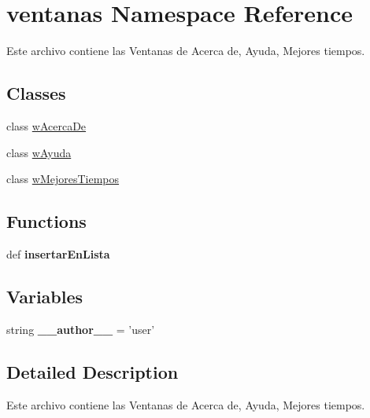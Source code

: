 \hypertarget{namespaceventanas}{\section{ventanas Namespace Reference}
\label{namespaceventanas}
}


Este archivo contiene las Ventanas de Acerca de, Ayuda, Mejores tiempos.  


\subsection*{Classes}
\begin{DoxyCompactItemize}
\item 
class \hyperlink{classventanas_1_1w_acerca_de}{w\-Acerca\-De}
\item 
class \hyperlink{classventanas_1_1w_ayuda}{w\-Ayuda}
\item 
class \hyperlink{classventanas_1_1w_mejores_tiempos}{w\-Mejores\-Tiempos}
\end{DoxyCompactItemize}
\subsection*{Functions}
\begin{DoxyCompactItemize}
\item 
\hypertarget{namespaceventanas_a4544f8e751bea0855961d5c0c77a63be}{def {\bfseries insertar\-En\-Lista}}\label{namespaceventanas_a4544f8e751bea0855961d5c0c77a63be}

\end{DoxyCompactItemize}
\subsection*{Variables}
\begin{DoxyCompactItemize}
\item 
\hypertarget{namespaceventanas_aa80777d1173f2cdf2e5d6bdccd7b67df}{string {\bfseries \-\_\-\-\_\-author\-\_\-\-\_\-} = 'user'}\label{namespaceventanas_aa80777d1173f2cdf2e5d6bdccd7b67df}

\end{DoxyCompactItemize}


\subsection{Detailed Description}
Este archivo contiene las Ventanas de Acerca de, Ayuda, Mejores tiempos. 
